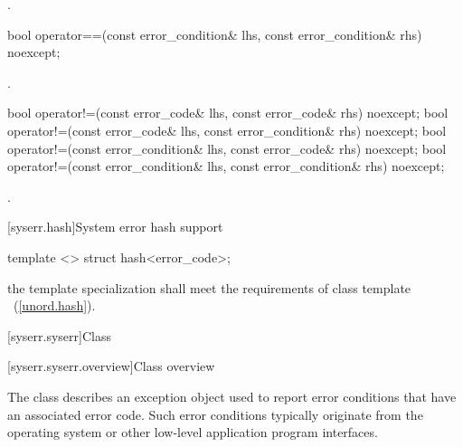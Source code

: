 \begin{itemdescr}
\pnum
\returns {}.
\end{itemdescr}

%
%
\begin{itemdecl}
bool operator==(const error_condition& lhs, const error_condition& rhs) noexcept;
\end{itemdecl}

\begin{itemdescr}
\pnum
\returns {}.
\end{itemdescr}

%
%
%
%
\begin{itemdecl}
bool operator!=(const error_code& lhs, const error_code& rhs) noexcept;
bool operator!=(const error_code& lhs, const error_condition& rhs) noexcept;
bool operator!=(const error_condition& lhs, const error_code& rhs) noexcept;
bool operator!=(const error_condition& lhs, const error_condition& rhs) noexcept;
\end{itemdecl}

\begin{itemdescr}
\pnum
\returns {}.
\end{itemdescr}

[syserr.hash]{System error hash support}

%
\begin{itemdecl}
template <> struct hash<error_code>;
\end{itemdecl}

\begin{itemdescr}
\pnum\requires the template specialization shall meet the requirements of class template
~(\ref{unord.hash}).
\end{itemdescr}

[syserr.syserr]{Class }

[syserr.syserr.overview]{Class  overview}

\pnum
The class  describes an exception object used to
report error conditions that have an associated error code. Such error
conditions typically originate from the operating system or other low-level
application program interfaces.

